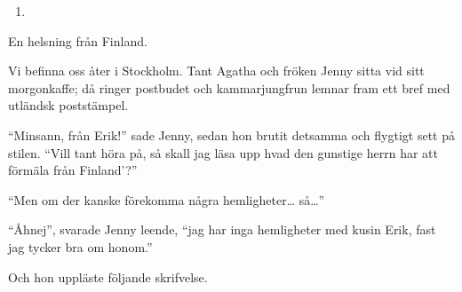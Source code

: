 \begin{enumerate}
\def\labelenumi{\arabic{enumi}.}
\setcounter{enumi}{5}
\tightlist
\item
\end{enumerate}

En helsning från Finland.

Vi befinna oss åter i Stockholm. Tant Agatha och fröken Jenny sitta vid
sitt morgonkaffe; då ringer postbudet och kammarjungfrun lemnar fram ett
bref med utländsk poststämpel.

``Minsann, från Erik!'' sade Jenny, sedan hon brutit detsamma och
flygtigt sett på stilen. ``Vill tant höra på, så skall jag läsa upp hvad
den gunstige herrn har att förmäla från Finland'?''

``Men om der kanske förekomma några hemligheter\ldots{} så\ldots{}''

``Åhnej'', svarade Jenny leende, ``jag har inga hemligheter med kusin
Erik, fast jag tycker bra om honom.''

Och hon uppläste följande skrifvelse.

